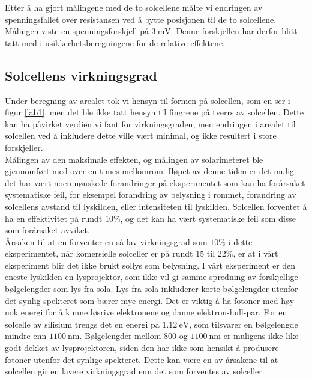 \documentclass[%
 reprint,
 amsmath,amssymb,
 aps,
 norsk,
 booktabs
]{revtex4-1}
\begin{document}
Etter å ha gjort målingene med de to solcellene målte vi endringen av spenningsfallet over resistansen ved å bytte posisjonen til de to solcellene. Målingen viste en spenningsforskjell på $\SI{3}{\milli\volt}$. Denne forskjellen har derfor blitt tatt med i usikkerhetsberegningene for de relative effektene.
\subsection{Solcellens virkningsgrad}
Under beregning av arealet tok vi hensyn til formen på solcellen, som en ser i figur \vref{lab1}, men det ble ikke tatt hensyn til fingrene på tverrs av solcellen. Dette kan ha påvirket verdien vi fant for virkningsgraden, men endringen i arealet til solcellen ved å inkludere dette ville vært minimal, og ikke resultert i store forskjeller.\\
Målingen av den maksimale effekten, og målingen av solarimeteret ble gjennomført med over en times mellomrom. Iløpet av denne tiden er det mulig det har vært noen uønskede forandringer på eksperimentet som kan ha forårsaket systematiske feil, for eksempel forandring av belysning i rommet, forandring av solcellens avstand til lyskilden, eller intensiteten til lyskilden. Solcellen forventet å ha en effektivitet på rundt $10\%$, og det kan ha vært systematiske feil som disse som forårsaket avviket.\\
Årsaken til at en forventer en så lav virkningsgrad som $10\%$ i dette eksperimentet, når komersielle solceller er på rundt $15$ til $22\%$, er at i vårt eksperiment blir det ikke brukt sollys som belysning. I vårt eksperiment er den eneste lyskilden en lysprojektor, som ikke vil gi samme spredning av forskjellige bølgelengder som lys fra sola. Lys fra sola inkluderer korte bølgelengder utenfor det synlig spekteret som bærer mye energi. Det er viktig å ha fotoner med høy nok energi for å kunne løsrive elektronene og danne elektron-hull-par. For en solcelle av silisium trengs det en energi på $\SI{1.12}{\electronvolt}$, som tilsvarer en bølgelengde mindre enn $\SI{1100}{\nano\meter}$. Bølgelengder mellom $800$ og $\SI{1100}{\nano\meter}$ er muligens ikke like godt dekket av lysprojektoren, siden den har ikke som hensikt å produsere fotoner utenfor det synlige spekteret. Dette kan være en av årsakene til at solcellen gir en lavere virkningsgrad enn det som forventes av solceller.
\end{document}
